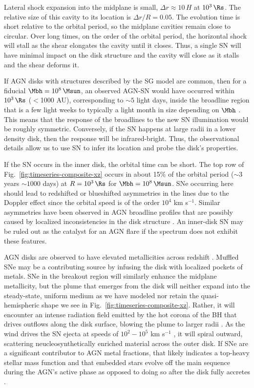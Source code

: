 Lateral shock expansion into the midplane is small, $\Delta r\approx 10\,H$ at $10^3\,\Rs$.
The relative size of this cavity to its location is $\Delta r/R = 0.05$.
The evolution time is short relative to the orbital period, so the midplane cavities remain close to circular.
Over long times, on the order of the orbital period, the horizontal shock will stall as the shear elongates the cavity until it closes.
Thus, a single SN will have minimal impact on the disk structure and the cavity will close as it stalls and the shear deforms it.

If AGN disks with structures described by the SG model are common, then for a fiducial $\Mbh=10^8\,\Msun$, an observed AGN-SN would have occurred within $10^3\,\Rs$ ($<$1000 AU), corresponding to $\sim5$ light days, inside the broadline region that is a few light weeks to typically a light month in size depending on $\Mbh$ \citep{BlandfordMcKee82}.
This means that the response of the broadlines to the new SN illumination would be roughly symmetric.
Conversely, if the SN happens at large radii in a lower density disk, then the response will be infrared-bright.
Thus, the observational details allow us to use SN to infer its location and probe the disk's properties.

If the SN occurs in the inner disk, the orbital time can be short.
The top row of Fig.~\ref{fig:timeseries-composite-xz} occurs in about 15\% of the orbital period ($\sim3$ years $\sim1000$ days) at $R=10^3\,\Rs$ for $\Mbh=10^8\,\Msun$.
SNe occurring here should lead to redshifted or blueshifted asymmetries in the lines due to the Doppler effect since the orbital speed is of the order $10^4$ km s$^{-1}$.
Similar asymmetries have been observed in AGN broadline profiles that are possibly caused by localized inconsistencies in the disk structure \citep[e.g., spiral arms,][]{Schimoia+17}.
An inner-disk SN may be ruled out as the catalyst for an AGN flare if the spectrum does not exhibit these features.

AGN disks are observed to have elevated metallicities across redshift \citep{Dors+14,Onoue+2020}.
Muffled SNe may be a contributing source by infusing the disk with localized pockets of metals.
SNe in the breakout region will similarly enhance the midplane metallicity, but the plume that emerges from the disk will neither expand into the steady-state, uniform medium as we have modeled nor retain the quasi-hemispheric shape we see in Fig.~\ref{fig:timeseries-composite-xz}.
Rather, it will encounter an intense radiation field emitted by the hot corona of the BH that drives outflows along the disk surface, blowing the plume to larger radii \citep{CrenshawKraemerGeorge03,ProgaKallman04}.
As the wind drives the SN ejecta at speeds of $10^2-10^5$ km s$^{-1}$ \citep{Parker+17,Mehdipour+17}, it will spiral outward, scattering neucleosynthetically enriched material across the outer disk.
If SNe are a significant contributor to AGN metal fractions, that likely indicates a top-heavy stellar mass function \citep{FanWu23} and that embedded stars evolve off the main sequence during the AGN's active phase \citep{HuangLinShields23} as opposed to doing so after the disk fully accretes \citep{CantielloJermynLin21}.

